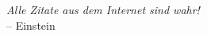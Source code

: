 
\thispagestyle{empty}
\textit{
	\qquad Alle Zitate aus dem Internet sind wahr! \qquad
} \\ -- Einstein
